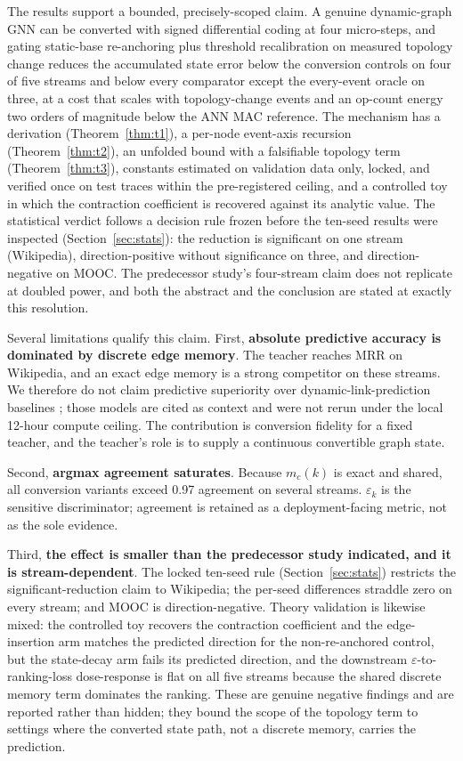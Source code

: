 \documentclass[preprint,12pt]{elsarticle}
\begin{document}
The results support a bounded, precisely-scoped claim. A genuine dynamic-graph GNN can be converted with signed differential coding at four micro-steps, and gating static-base re-anchoring plus threshold recalibration on measured topology change reduces the accumulated state error below the conversion controls on four of five streams and below every comparator except the every-event oracle on three, at a cost that scales with topology-change events and an op-count energy two orders of magnitude below the ANN MAC reference. The mechanism has a derivation (Theorem~\ref{thm:t1}), a per-node event-axis recursion (Theorem~\ref{thm:t2}), an unfolded bound with a falsifiable topology term (Theorem~\ref{thm:t3}), constants estimated on validation data only, locked, and verified once on test traces within the pre-registered ceiling, and a controlled toy in which the contraction coefficient is recovered against its analytic value. The statistical verdict follows a decision rule frozen before the ten-seed results were inspected (Section~\ref{sec:stats}): the reduction is significant on one stream (Wikipedia), direction-positive without significance on three, and direction-negative on MOOC. The predecessor study's four-stream claim does not replicate at doubled power, and both the abstract and the conclusion are stated at exactly this resolution.

Several limitations qualify this claim. First, \textbf{absolute predictive accuracy is dominated by discrete edge memory}. The teacher reaches \TeacherMRRWikipedia{} MRR on Wikipedia, and an exact edge memory is a strong competitor on these streams. We therefore do not claim predictive superiority over dynamic-link-prediction baselines \cite{rossi2020tgn,yu2023dyglib,cong2023graphmixer,gao2025hyperevent}; those models are cited as context and were not rerun under the local 12-hour compute ceiling. The contribution is conversion fidelity for a fixed teacher, and the teacher's role is to supply a continuous convertible graph state.

Second, \textbf{argmax agreement saturates}. Because $m_c(k)$ is exact and shared, all conversion variants exceed 0.97 agreement on several streams. $\varepsilon_k$ is the sensitive discriminator; agreement is retained as a deployment-facing metric, not as the sole evidence.

Third, \textbf{the effect is smaller than the predecessor study indicated, and it is stream-dependent}. The locked ten-seed rule (Section~\ref{sec:stats}) restricts the significant-reduction claim to Wikipedia; the per-seed differences straddle zero on every stream; and MOOC is direction-negative. Theory validation is likewise mixed: the controlled toy recovers the contraction coefficient and the edge-insertion arm matches the predicted direction for the non-re-anchored control, but the state-decay arm fails its predicted direction, and the downstream $\varepsilon$-to-ranking-loss dose-response is flat on all five streams because the shared discrete memory term dominates the ranking. These are genuine negative findings and are reported rather than hidden; they bound the scope of the topology term to settings where the converted state path, not a discrete memory, carries the prediction.
\end{document}
